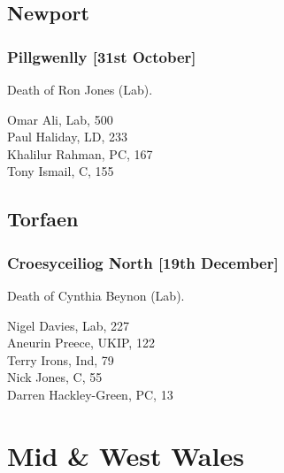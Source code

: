 \documentclass[a4paper,openany,10pt]{book}
\begin{document}
\subsection*{Newport}

\subsubsection*{Pillgwenlly \hspace*{\fill}\nolinebreak[1]%
\enspace\hspace*{\fill}
[31st October]}


Death of Ron Jones (Lab).



Omar Ali, Lab, 500\\
Paul Haliday, LD, 233\\
Khalilur Rahman, PC, 167\\
Tony Ismail, C, 155\\


\subsection*{Torfaen}

\subsubsection*{Croesyceiliog North \hspace*{\fill}\nolinebreak[1]%
\enspace\hspace*{\fill}
[19th December]}


Death of Cynthia Beynon (Lab).



Nigel Davies, Lab, 227\\
Aneurin Preece, UKIP, 122\\
Terry Irons, Ind, 79\\
Nick Jones, C, 55\\
Darren Hackley-Green, PC, 13\\


\vfill

\section[Mid and West Wales]{Mid \& West Wales}
\end{document}
